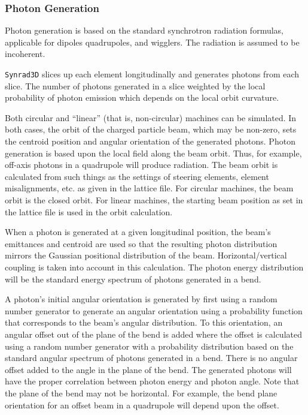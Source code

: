 \subsubsection{Photon Generation}
Photon generation is based on the standard synchrotron radiation formulas, applicable for dipoles quadrupoles, and wigglers. The radiation is assumed to be incoherent.

\texttt{Synrad3D}\xspace  slices up each element longitudinally
and generates photons from each slice. The number of photons generated
in a slice weighted by the local probability of photon emission which
depends on the local orbit curvature.

Both circular and ``linear'' (that is, non-circular) machines can be
simulated.  In both cases, the orbit of the charged particle beam,
which may be non-zero, sets the centroid position and angular
orientation of the generated photons. Photon generation is based upon
the local field along the beam orbit. Thus, for example, off-axis
photons in a quadrupole will produce radiation. The beam orbit is
calculated from such things as the settings of steering elements,
element misalignments, etc. as given in the lattice file. For circular
machines, the beam orbit is the closed orbit. For linear machines, the
starting beam position as set in the lattice file is used in the orbit
calculation.

When a photon is generated at a given longitudinal position, the
beam's emittances and centroid are used so that the resulting photon
distribution mirrors the Gaussian positional distribution of the beam.
Horizontal/vertical coupling is taken into account in this
calculation. The photon energy distribution will be the standard
energy spectrum of photons generated in a bend.

A photon's initial angular orientation is generated by first using a
random number generator to generate an angular orientation using a
probability function that corresponds to the beam's angular
distribution. To this orientation, an angular offset out of the plane
of the bend is added where the offset is calculated using a random
number generator with a probability distribution based on the standard
angular spectrum of photons generated in a bend. There is no angular
offset added to the angle in the plane of the bend. The generated
photons will have the proper correlation between photon energy and
photon angle. Note that the plane of the bend may not be
horizontal. For example, the bend plane orientation for an offset beam
in a quadrupole will depend upon the offset.
